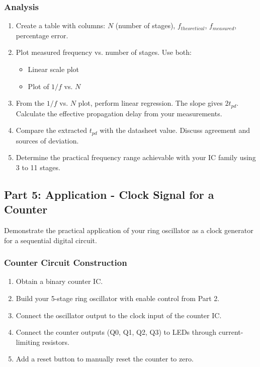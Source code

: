 \documentclass[10pt]{article}
\begin{document}
\subsubsection{Analysis}

\begin{enumerate}
    \item Create a table with columns: $N$ (number of stages), $f_{theoretical}$, $f_{measured}$, percentage error. 
    
    \item Plot measured frequency vs. number of stages. Use both: 
    \begin{itemize}
        \item Linear scale plot
        \item Plot of $1/f$ vs. $N$ 
    \end{itemize}
    
    \item From the $1/f$ vs. $N$ plot, perform linear regression.  The slope gives $2t_{pd}$.  Calculate the effective propagation delay from your measurements.
    
    \item Compare the extracted $t_{pd}$ with the datasheet value.  Discuss agreement and sources of deviation.
    
    \item Determine the practical frequency range achievable with your IC family using 3 to 11 stages.
\end{enumerate}


\subsection{Part 5: Application - Clock Signal for a Counter}

Demonstrate the practical application of your ring oscillator as a clock generator for a sequential digital circuit.

\subsubsection{Counter Circuit Construction}

\begin{enumerate}
    \item Obtain a binary counter IC.
    
    \item Build your 5-stage ring oscillator with enable control from Part 2.
    
    \item Connect the oscillator output to the clock input of the counter IC.
    
    \item Connect the counter outputs (Q0, Q1, Q2, Q3) to LEDs through current-limiting resistors.
    
    \item Add a reset button to manually reset the counter to zero.
\end{enumerate}
\end{document}
